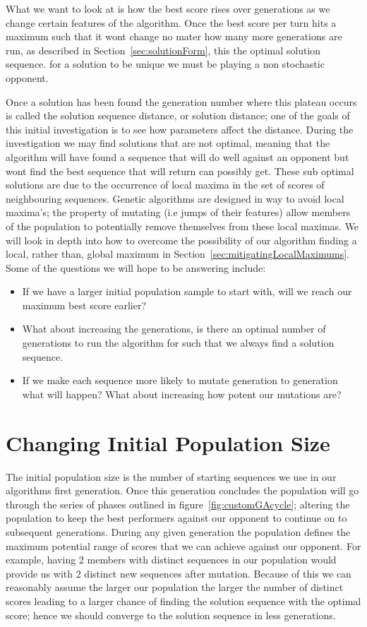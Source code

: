 What we want to look at is how the best score rises over generations as we change certain features of the algorithm.
Once the best score per turn hits a maximum such that it wont change no mater how many more generations are run, as described in Section~\ref{sec:solutionForm}, this the optimal solution sequence. for a solution to be unique we must be playing a non stochastic opponent.

Once a solution has been found the generation number where this plateau occurs is called the solution sequence distance, or solution distance;
one of the goals of this initial investigation is to see how parameters affect the distance.
During the investigation we may find solutions that are not optimal, meaning that the algorithm will have found a sequence that will do well against an opponent but wont find the best sequence that will return can possibly get.
These sub optimal solutions are due to the occurrence of local maxima in the set of scores of neighbouring sequences.
Genetic algorithms are designed in way to avoid local maxima's;
the property of mutating (i.e jumps of their features) allow members of the population to potentially remove themselves from these local maximas.
We will look in depth into how to overcome the possibility of our algorithm finding a local, rather than, global maximum in Section~\ref{sec:mitigatingLocalMaximums}.
Some of the questions we will hope to be answering include:
\begin{itemize}
    \item If we have a larger initial population sample to start with, will we reach our maximum best score earlier?
    \item What about increasing the generations, is there an optimal number of generations to run the algorithm for such that we always find a solution sequence.
    \item If we make each sequence more likely to mutate generation to generation what will happen?
    What about increasing how potent our mutations are?
\end{itemize}

\section{Changing Initial Population Size}\label{sec:ChangingInitialPopulationSize}
The initial population size is the number of starting sequences we use in our algorithms first generation.
Once this generation concludes the population will go through the series of phases outlined in figure~\ref{fig:customGAcycle}; altering the population to keep the best performers against our opponent to continue on to subsequent generations.
During any given generation the population defines the maximum potential range of scores that we can achieve against our opponent.
For example, having 2 members with distinct sequences in our population would provide us with 2 distinct new sequences after mutation.
Because of this we can reasonably assume the larger our population the larger the number of distinct scores leading to a larger chance of finding the solution sequence with the optimal score;
hence we should converge to the solution sequence in less generations.

